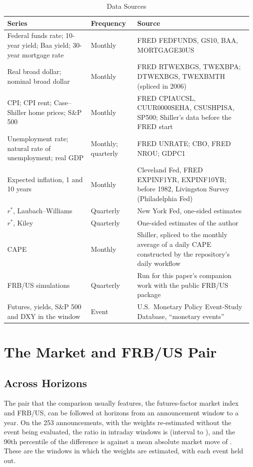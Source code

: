 \documentclass[11pt]{article}
\newcommand{\rs}{r^{*}}
\begin{document}
\begin{appendices}
\begin{table}[tbp]\centering\small
\caption{Data Sources}\label{tab:data}
\begin{tabular}{p{}p{}p{}}\toprule
Series & Frequency & Source \\\midrule
Federal funds rate; 10-year yield; Baa yield; 30-year mortgage rate & Monthly & FRED FEDFUNDS, GS10, BAA, MORTGAGE30US \\
Real broad dollar; nominal broad dollar & Monthly & FRED RTWEXBGS, TWEXBPA; DTWEXBGS, TWEXBMTH (spliced in 2006) \\
CPI; CPI rent; Case--Shiller home prices; S\&P 500 & Monthly & FRED CPIAUCSL, CUUR0000SEHA, CSUSHPISA, SP500; Shiller's data before the FRED start \\
Unemployment rate; natural rate of unemployment; real GDP & Monthly; quarterly & FRED UNRATE; CBO, FRED NROU; GDPC1 \\
Expected inflation, 1 and 10 years & Monthly & Cleveland Fed, FRED EXPINF1YR, EXPINF10YR; before 1982, Livingston Survey (Philadelphia Fed) \\
$\rs$, Laubach--Williams & Quarterly & New York Fed, one-sided estimates \\
$\rs$, Kiley & Quarterly & One-sided estimates of the author \\
CAPE & Monthly & Shiller, spliced to the monthly average of a daily CAPE constructed by the repository's daily workflow \\
FRB/US simulations & Quarterly & Run for this paper's companion work with the public FRB/US package \\
Futures, yields, S\&P 500 and DXY in the window & Event & U.S.\ Monetary Policy Event-Study Database, ``monetary events'' \citep{acosta2025} \\
\bottomrule
\end{tabular}
\end{table}

\section{The Market and FRB/US Pair}\label{app:pair}
\subsection{Across Horizons}\label{sec:horizons}
The pair that the comparison usually features, the futures-factor market index and FRB/US, can be followed at horizons from an announcement window to a year. On the 253 announcements, with the weights re-estimated without the event being evaluated, the ratio in intraday windows is  (interval  to ), and the 90th percentile of the difference is  against a mean absolute market move of . These are the windows in which the weights are estimated, with each event held out.


\end{appendices}
\end{document}
